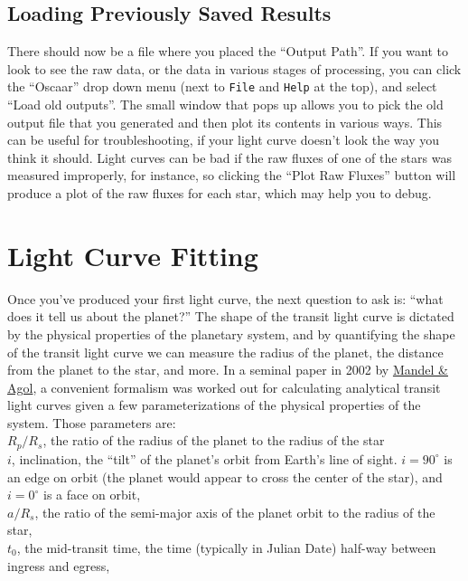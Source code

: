 \documentclass[a4paper]{article}
\newcommand{\code}[1]{\texttt{#1}}
\begin{document}
\subsection{Loading Previously Saved Results}
There should now be a file where you placed the ``Output Path''. If you want to look to see the raw data, or the data in various stages of processing, you can click the ``Oscaar'' drop down menu (next to \code{File} and \code{Help} at the top), and select ``Load old outputs''. The small window that pops up allows you to pick the old output file that you generated and then plot its contents in various ways. This can be useful for troubleshooting, if your light curve doesn't look the way you think it should. Light curves can be bad if the raw fluxes of one of the stars was measured improperly, for instance, so clicking the ``Plot Raw Fluxes'' button will produce a plot of the raw fluxes for each star, which may help you to debug. 


\section{Light Curve Fitting} \label{sec:fitting}
Once you've produced your first light curve, the next question to ask is: ``what does it tell us about the planet?'' The shape of the transit light curve is dictated by the physical properties of the planetary system, and by quantifying the shape of the transit light curve we can measure the radius of the planet, the distance from the planet to the star, and more. In a seminal paper in 2002 by \href{http://adsabs.harvard.edu/abs/2002ApJ...580L.171M}{Mandel \& Agol}, a convenient formalism was worked out for calculating analytical transit light curves given a few parameterizations of the physical properties of the system. Those parameters are: \\

$R_p / R_s$, the ratio of the radius of the planet to the radius of the star\\

$i$, inclination, the ``tilt'' of the planet's orbit from Earth's line of sight. $i=90^\circ$ is an edge on orbit (the planet would appear to cross the center of the star), and $i=0^\circ$ is a face on orbit,\\

$a/R_s$, the ratio of the semi-major axis of the planet orbit to the radius of the star,\\

$t_0$, the mid-transit time, the time (typically in Julian Date) half-way between ingress and egress,\\
\end{document}
